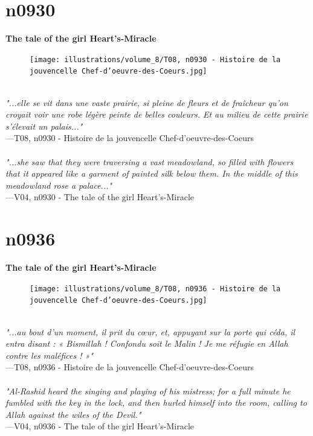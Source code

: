 \documentclass[../Carre_nights.tex]{subfiles}
\begin{document}
\newpage

\section{n0930}
\textbf{\Large{The tale of the girl Heart’s-Miracle}} \\

\begin{figure}[ht]
\centering
\texttt{[image: illustrations/volume\_8/T08, n0930 - Histoire de la jouvencelle Chef-d’oeuvre-des-Coeurs.jpg]}
\end{figure}

\textit{\\
"...elle se vit dans une vaste prairie, si pleine de fleurs et de fraîcheur qu’on croyait voir une robe légère peinte de belles couleurs. Et au milieu de cette prairie s’élevait un palais..."} \\
—T08, n0930 - Histoire de la jouvencelle Chef-d’oeuvre-des-Coeurs \\~\\
\textit{"...she saw that they were traversing a vast meadowland, so filled with flowers that it appeared like a garment of painted silk below them. In the middle of this meadowland rose a palace..."} \\
—V04, n0930 - The tale of the girl Heart’s-Miracle

\newpage

\section{n0936}
\textbf{\Large{The tale of the girl Heart’s-Miracle}} \\

\begin{figure}[ht]
\centering
\texttt{[image: illustrations/volume\_8/T08, n0936 - Histoire de la jouvencelle Chef-d’oeuvre-des-Coeurs.jpg]}
\end{figure}

\textit{\\
"...au bout d’un moment, il prit du cœur, et, appuyant sur la porte qui céda, il entra disant : « Bismillah ! Confondu soit le Malin ! Je me réfugie en Allah contre les maléfices ! »"} \\
—T08, n0936 - Histoire de la jouvencelle Chef-d’oeuvre-des-Coeurs \\~\\
\textit{"Al-Rashid heard the singing and playing of his mistress; for a full minute he fumbled with the key in the lock, and then hurled himself into the room, calling to Allah against the wiles of the Devil."} \\
—V04, n0936 - The tale of the girl Heart’s-Miracle
\end{document}
